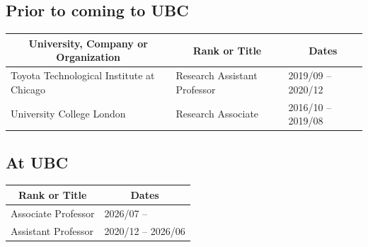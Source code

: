 \documentclass[10pt]{article}
\begin{document}
{\subsection{Prior to coming to UBC}
\noindent\vspace{-2em}
\begin{table}[h!]
  \begin{tabular}{ p{} p{} p{} }
    \toprule
    \multicolumn{1}{c}{\bf University, Company or Organization} & \multicolumn{1}{c}{\bf Rank or Title} & \multicolumn{1}{c}{\bf Dates} \\
    \midrule
    Toyota Technological Institute at Chicago  & Research Assistant Professor  & 2019/09 -- 2020/12 \\
    University College London & Research Associate   & 2016/10 -- 2019/08  \\
    \bottomrule
  \end{tabular}
\end{table}


\vspace{-1em}
\subsection{At UBC}
\noindent\vspace{-2em}
\begin{table}[h!]
  \begin{tabular}{ p{} p{} }
    \toprule
    \multicolumn{1}{c}{\bf Rank or Title} & \multicolumn{1}{c}{\bf Dates} \\
    \midrule
    Associate Professor               & 2026/07 --         \\
    Assistant Professor               & 2020/12 -- 2026/06        \\
    \bottomrule
  \end{tabular}
\end{table}

}
\end{document}
